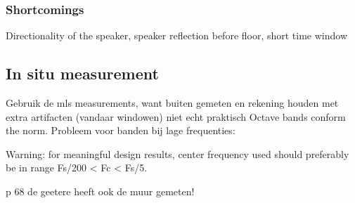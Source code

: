 \subsubsection{Shortcomings}

Directionality of the speaker, speaker reflection before floor, short time window



\subsection{In situ measurement}
Gebruik de mls measurements, want buiten gemeten en rekening houden met extra artifacten (vandaar windowen)
niet echt praktisch
Octave bands conform the norm. Probleem voor banden bij lage frequenties:

{\huge Warning: for meaningful design results, center frequency used should preferably be in range Fs/200 < Fc < Fs/5.}

p 68 de geetere heeft ook de muur gemeten!




%
